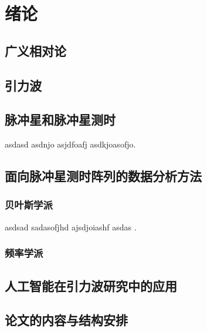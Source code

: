 \chapter{绪论}
\label{chap:绪论}
\section{广义相对论}

\section{引力波}
\section{脉冲星和脉冲星测时}
asdasd asdnjo asjdfoafj asdkjoasofjo.
\section{面向脉冲星测时阵列的数据分析方法}
\label{chap:data analysis methods for pta}
\subsection{贝叶斯学派}
asdsad sadasofjhd ajsdjoiashf asdas .
\subsection{频率学派}
\section{人工智能在引力波研究中的应用}
\section{论文的内容与结构安排}